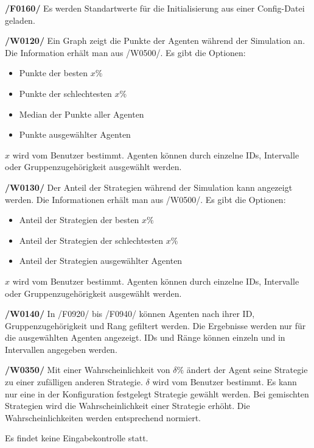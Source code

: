 \textbf{/F0160/} 
Es werden Standartwerte für die Initialisierung aus einer Config-Datei geladen.

\textbf{/W0120/}
Ein Graph zeigt die Punkte der Agenten während der Simulation an. Die Information erhält man aus /W0500/. Es gibt die Optionen:
\begin{itemize}
\item Punkte der besten $x\%$
\item Punkte der schlechtesten $x\%$
\item Median der Punkte aller Agenten
\item Punkte ausgewählter Agenten
\end{itemize}
$x$ wird vom Benutzer bestimmt. Agenten können durch einzelne IDs, Intervalle oder Gruppenzugehörigkeit ausgewählt werden. 

\textbf{/W0130/}
Der Anteil der Strategien während der Simulation kann angezeigt werden. Die Informationen erhält man aus /W0500/. Es gibt die Optionen:
\begin{itemize}
\item Anteil der Strategien der besten $x\%$
\item Anteil der Strategien der schlechtesten $x\%$
\item Anteil der Strategien ausgewählter Agenten
\end{itemize}
$x$ wird vom Benutzer bestimmt. Agenten können durch einzelne IDs, Intervalle  oder Gruppenzugehörigkeit ausgewählt werden. 

\textbf{/W0140/}
In /F0920/ bis /F0940/ können Agenten nach ihrer ID, Gruppenzugehörigkeit und Rang gefiltert werden. Die Ergebnisse werden nur für die ausgewählten Agenten angezeigt. IDs und Ränge können einzeln und in Intervallen angegeben werden.

\textbf{/W0350/}
Mit einer Wahrscheinlichkeit von $\delta\%$ ändert der Agent seine Strategie zu einer zufälligen anderen Strategie. $\delta$ wird vom Benutzer bestimmt. Es kann nur eine in der Konfiguration festgelegt Strategie gewählt werden. Bei gemischten Strategien wird die Wahrscheinlichkeit einer Strategie erhöht. Die Wahrscheinlichkeiten werden entsprechend normiert.

Es findet keine Eingabekontrolle statt.